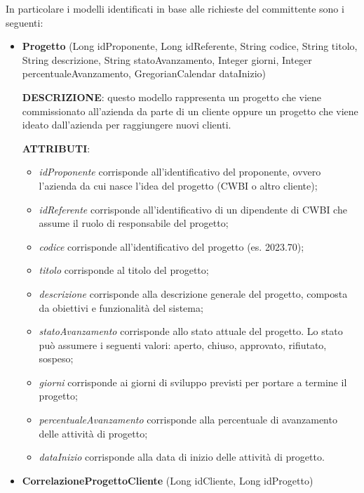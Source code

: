 \noindent In particolare i modelli identificati in base alle richieste del committente sono i seguenti:
\begin{itemize}
\item \textbf{Progetto} (Long idProponente, Long idReferente, String codice, String titolo, String descrizione, String statoAvanzamento, Integer giorni, Integer percentualeAvanzamento, GregorianCalendar dataInizio)

\setlength{\parskip}{3ex}

\noindent \textbf{DESCRIZIONE}: questo modello rappresenta un progetto che viene commissionato all'azienda da parte di un cliente oppure un progetto che viene ideato dall'azienda per raggiungere nuovi clienti.

\setlength{\parskip}{3ex}

\noindent \textbf{ATTRIBUTI}:
\begin{itemize}
\item \textit{idProponente} corrisponde all'identificativo del  proponente, ovvero l'azienda da cui nasce l'idea del progetto (CWBI o altro cliente);
\item \textit{idReferente} corrisponde all'identificativo di un dipendente di CWBI che assume il ruolo di responsabile del progetto;
\item \textit{codice} corrisponde all'identificativo del progetto (es. 2023.70);
\item \textit{titolo} corrisponde al titolo del progetto;
\item \textit{descrizione} corrisponde alla descrizione generale del progetto, composta da obiettivi e funzionalità del sistema;
\item \textit{statoAvanzamento} corrisponde allo stato attuale  del progetto. Lo stato può assumere i seguenti valori: {aperto, chiuso, approvato, rifiutato, sospeso};
\item \textit{giorni} corrisponde ai giorni di sviluppo previsti per portare a termine il progetto;
\item \textit{percentualeAvanzamento} corrisponde alla percentuale di avanzamento delle attività di progetto;
\item \textit{dataInizio} corrisponde alla data di inizio delle attività di progetto.
\end{itemize}

\setlength{\parskip}{6ex}

\item \textbf{CorrelazioneProgettoCliente} (Long idCliente, Long idProgetto)


\end{itemize}
